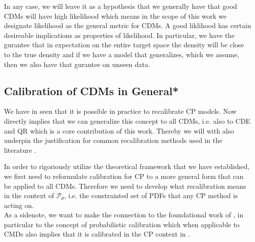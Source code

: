 In any case, we will leave it as a hypothesis that we generally have that good CDMs will have high likelihood which means in the scope of this work we designate likelihood as the general metric for CDMs. A good liklihood has certain desireable implications as properties of likelihood. In particular, we have the gurantee that in expectation on the entire target space the density will be close to the true density and if we have a model that generalizes, which we assume, then we also have that gurantee on unseen data.%

\subsection{Calibration of CDMs in General*}\label{sec:calibration_cde_general}

We have in  seen that it is possible in practice to recalibrate CP models. Now  directly implies that we can generalize this concept to all CDMs, i.e. also to CDE and QR which is a core contribution of this work. Thereby we will with  also underpin the justification for common recalibration methods used in the literature \cite{sesia2021conformal}.

In order to rigoriously utilize the theoretical framework that we have established, we first need to reformulate calibration for CP to a more general form that can be applied to all CDMs. Therefore we need to develop what recalibration means in the context of $\mathscr{P}_{\theta}$, i.e. the constrainted set of PDFs that any CP method is acting on.\\
As a sidenote, we want to make the connection to the foundational work of \cite{gneiting2007probabilistic}, in particular to the concept of probabilistic calibration which when applicable to CMDs also implies that it is calibrated in the CP context in .

